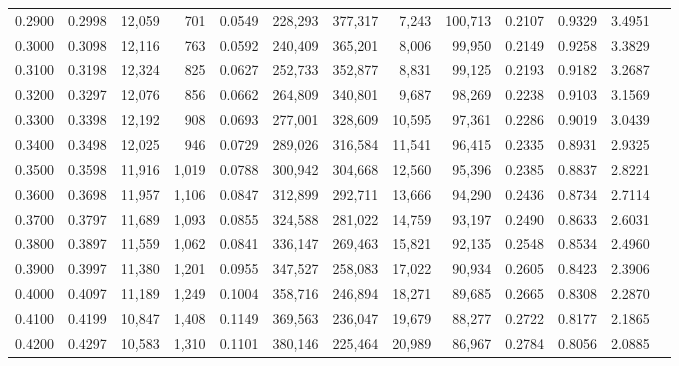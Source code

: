 \begin{tabular}{rrrrrrrrrrrrr}
0.2900 & 0.2998 & 12,059 &   701 &                                     0.0549 & 228,293 & 377,317 &   7,243 & 100,713 & 0.2107 & 0.9329 & 3.4951 \\
0.3000 & 0.3098 & 12,116 &   763 &                                     0.0592 & 240,409 & 365,201 &   8,006 &  99,950 & 0.2149 & 0.9258 & 3.3829 \\
0.3100 & 0.3198 & 12,324 &   825 &                                     0.0627 & 252,733 & 352,877 &   8,831 &  99,125 & 0.2193 & 0.9182 & 3.2687 \\
0.3200 & 0.3297 & 12,076 &   856 &                                     0.0662 & 264,809 & 340,801 &   9,687 &  98,269 & 0.2238 & 0.9103 & 3.1569 \\
0.3300 & 0.3398 & 12,192 &   908 &                                     0.0693 & 277,001 & 328,609 &  10,595 &  97,361 & 0.2286 & 0.9019 & 3.0439 \\
0.3400 & 0.3498 & 12,025 &   946 &                                     0.0729 & 289,026 & 316,584 &  11,541 &  96,415 & 0.2335 & 0.8931 & 2.9325 \\
0.3500 & 0.3598 & 11,916 & 1,019 &                                     0.0788 & 300,942 & 304,668 &  12,560 &  95,396 & 0.2385 & 0.8837 & 2.8221 \\
0.3600 & 0.3698 & 11,957 & 1,106 &                                     0.0847 & 312,899 & 292,711 &  13,666 &  94,290 & 0.2436 & 0.8734 & 2.7114 \\
0.3700 & 0.3797 & 11,689 & 1,093 &                                     0.0855 & 324,588 & 281,022 &  14,759 &  93,197 & 0.2490 & 0.8633 & 2.6031 \\
0.3800 & 0.3897 & 11,559 & 1,062 &                                     0.0841 & 336,147 & 269,463 &  15,821 &  92,135 & 0.2548 & 0.8534 & 2.4960 \\
0.3900 & 0.3997 & 11,380 & 1,201 &                                     0.0955 & 347,527 & 258,083 &  17,022 &  90,934 & 0.2605 & 0.8423 & 2.3906 \\
0.4000 & 0.4097 & 11,189 & 1,249 &                                     0.1004 & 358,716 & 246,894 &  18,271 &  89,685 & 0.2665 & 0.8308 & 2.2870 \\
0.4100 & 0.4199 & 10,847 & 1,408 &                                     0.1149 & 369,563 & 236,047 &  19,679 &  88,277 & 0.2722 & 0.8177 & 2.1865 \\
0.4200 & 0.4297 & 10,583 & 1,310 &                                     0.1101 & 380,146 & 225,464 &  20,989 &  86,967 & 0.2784 & 0.8056 & 2.0885 \\

\end{tabular}
